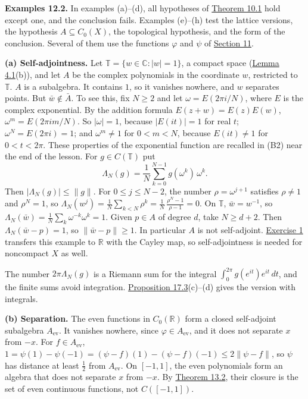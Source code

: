 \documentclass[
  english,
  11pt,
  a4paper,
]{article}
\begin{document}
\textbf{Examples 12.2.} In examples (a)--(d), all hypotheses of
\hyperlink{the-stone-weierstrass-theorem-for-functions-vanishing-at-infinity--oa-fnd-sw-09}{Theorem
10.1} hold except one, and the conclusion fails. Examples (e)--(h) test
the lattice versions, the hypothesis \(A\subseteq C_0(X)\), the
topological hypothesis, and the form of the conclusion. Several of them
use the functions \(\varphi\) and \(\psi\) of
\hyperlink{the-stone-weierstrass-theorem-for-functions-vanishing-at-infinity--oa-fnd-sw-13}{Section
11}.

\textbf{(a) Self-adjointness.} Let
\(\mathbb T=\{w\in\mathbb C:|w|=1\}\), a compact space
(\hyperlink{the-stone-weierstrass-theorem-for-functions-vanishing-at-infinity--oa-fnd-sw-15}{Lemma
4.1}(b)), and let \(A\) be the complex polynomials in the coordinate
\(w\), restricted to \(\mathbb T\). \(A\) is a subalgebra. It contains
\(1\), so it vanishes nowhere, and \(w\) separates points. But
\(\bar w\notin\bar A\). To see this, fix \(N\geq2\) and let
\(\omega=E(2\pi i/N)\), where \(E\) is the complex exponential. By the
addition formula \(E(z+w)=E(z)E(w)\), \(\omega^m=E(2\pi im/N)\). So
\(|\omega|=1\), because \(|E(it)|=1\) for real \(t\);
\(\omega^N=E(2\pi i)=1\); and \(\omega^m\neq1\) for \(0<m<N\), because
\(E(it)\neq1\) for \(0<t<2\pi\). These properties of the exponential
function are recalled in (B2) near the end of the lesson. For
\(g\in C(\mathbb T)\) put
\[\Lambda_N(g)=\frac1N\sum_{k=0}^{N-1}g(\omega^k)\,\omega^k .\] Then
\(|\Lambda_N(g)|\leq\|g\|\). For \(0\leq j\leq N-2\), the number
\(\rho=\omega^{j+1}\) satisfies \(\rho\neq1\) and \(\rho^N=1\), so
\(\Lambda_N(w^j)=\frac1N\sum_{k<N}\rho^k=\frac1N\,\frac{\rho^N-1}{\rho-1}=0\).
On \(\mathbb T\), \(\bar w=w^{-1}\), so
\(\Lambda_N(\bar w)=\frac1N\sum_k\omega^{-k}\omega^k=1\). Given
\(p\in A\) of degree \(d\), take \(N\geq d+2\). Then
\(\Lambda_N(\bar w-p)=1\), so \(\|\bar w-p\|\geq1\). In particular \(A\)
is not self-adjoint.
\hyperref[the-stone-weierstrass-theorem-for-functions-vanishing-at-infinity--exercises]{Exercise
1} transfers this example to \(\mathbb R\) with the Cayley map, so
self-adjointness is needed for noncompact \(X\) as well.

The number \(2\pi\Lambda_N(g)\) is a Riemann sum for the integral
\(\int_0^{2\pi}g(e^{it})e^{it}\,dt\), and the finite sums avoid
integration.
\hyperlink{the-stone-weierstrass-theorem-for-functions-vanishing-at-infinity--oa-fnd-sw-19}{Proposition
17.3}(c)--(d) gives the version with integrals.

\textbf{(b) Separation.} The even functions in \(C_0(\mathbb R)\) form a
closed self-adjoint subalgebra \(A_{\mathrm{ev}}\). It vanishes nowhere,
since \(\varphi\in A_{\mathrm{ev}}\), and it does not separate \(x\)
from \(-x\). For \(f\in A_{\mathrm{ev}}\),
\(1=\psi(1)-\psi(-1)=(\psi-f)(1)-(\psi-f)(-1)\leq2\|\psi-f\|\), so
\(\psi\) has distance at least \(\frac12\) from \(A_{\mathrm{ev}}\). On
\([-1,1]\), the even polynomials form an algebra that does not separate
\(x\) from \(-x\). By
\hyperlink{the-stone-weierstrass-theorem-for-functions-vanishing-at-infinity--oa-fnd-sw-12}{Theorem
13.2}, their closure is the set of even continuous functions, not
\(C([-1,1])\).
\end{document}
